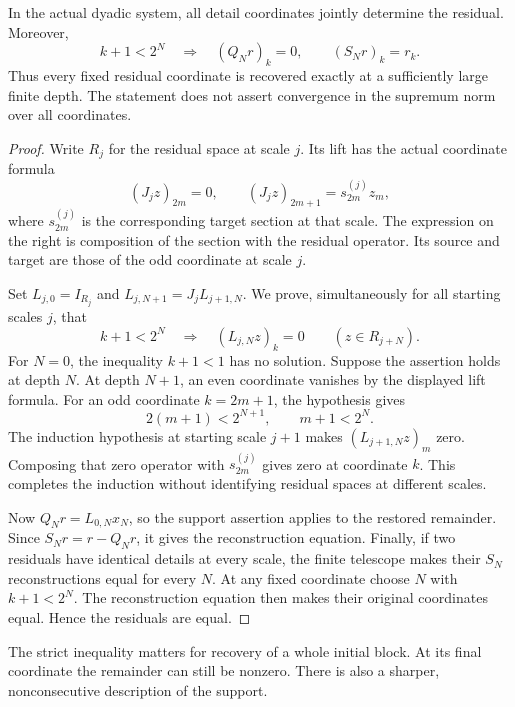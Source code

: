 \begin{theorem}\label{KS28}
In the actual dyadic system, all detail coordinates jointly determine the residual. Moreover,
\[
 k+1<2^N\quad\Longrightarrow\quad
 (Q_Nr)_k=0,\qquad(S_Nr)_k=r_k.
\]
Thus every fixed residual coordinate is recovered exactly at a sufficiently large finite depth. The statement does not assert convergence in the supremum norm over all coordinates.
\end{theorem}
\begin{proof}
Write \(R_j\) for the residual space at scale \(j\). Its lift has the actual coordinate formula
\[
 (J_jz)_{2m}=0,\qquad (J_jz)_{2m+1}=s^{(j)}_{2m}z_m,
\]
where \(s^{(j)}_{2m}\) is the corresponding target section at that scale. The expression on the right is composition of the section with the residual operator. Its source and target are those of the odd coordinate at scale \(j\).

Set \(L_{j,0}=I_{R_j}\) and \(L_{j,N+1}=J_jL_{j+1,N}\). We prove, simultaneously for all starting scales \(j\), that
\[
 k+1<2^N\quad\Longrightarrow\quad (L_{j,N}z)_k=0
 \qquad(z\in R_{j+N}).
\]
For \(N=0\), the inequality \(k+1<1\) has no solution. Suppose the assertion holds at depth \(N\). At depth \(N+1\), an even coordinate vanishes by the displayed lift formula. For an odd coordinate \(k=2m+1\), the hypothesis gives
\[
 2(m+1)<2^{N+1},\qquad m+1<2^N.
\]
The induction hypothesis at starting scale \(j+1\) makes \((L_{j+1,N}z)_m\) zero. Composing that zero operator with \(s^{(j)}_{2m}\) gives zero at coordinate \(k\). This completes the induction without identifying residual spaces at different scales.

Now \(Q_Nr=L_{0,N}x_N\), so the support assertion applies to the restored remainder. Since \(S_Nr=r-Q_Nr\), it gives the reconstruction equation. Finally, if two residuals have identical details at every scale, the finite telescope makes their \(S_N\) reconstructions equal for every \(N\). At any fixed coordinate choose \(N\) with \(k+1<2^N\). The reconstruction equation then makes their original coordinates equal. Hence the residuals are equal.
\end{proof}
The strict inequality matters for recovery of a whole initial block. At its final coordinate the remainder can still be nonzero. There is also a sharper, nonconsecutive description of the support.

